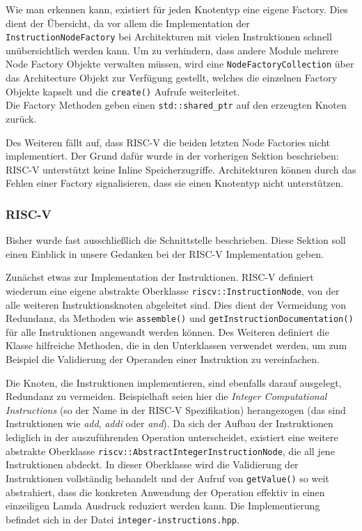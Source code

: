 Wie man erkennen kann, existiert für jeden Knotentyp eine eigene Factory. Dies
dient der Übersicht, da vor allem die Implementation der
\texttt{InstructionNodeFactory} bei Architekturen mit vielen Instruktionen
schnell unübersichtlich werden kann. Um zu verhindern, dass andere Module
mehrere Node Factory Objekte verwalten müssen, wird eine
\texttt{NodeFactoryCollection} über das Architecture Objekt zur Verfügung
gestellt, welches die einzelnen Factory Objekte kapselt und die
\texttt{create()} Aufrufe weiterleitet. \\
Die Factory Methoden geben einen \texttt{std::shared\_ptr} auf den erzeugten
Knoten zurück.

Des Weiteren fällt auf, dass RISC-V die beiden letzten Node Factories nicht
implementiert. Der Grund dafür wurde in der vorherigen Sektion beschrieben:
RISC-V unterstützt keine Inline Speicherzugriffe. Architekturen können durch das
Fehlen einer Factory signalisieren, dass sie einen Knotentyp nicht unterstützen.

\subsubsection{RISC-V}

Bisher wurde fast ausschließlich die Schnittstelle beschrieben. Diese Sektion
soll einen Einblick in unsere Gedanken bei der RISC-V Implementation geben.

Zunächst etwas zur Implementation der Instruktionen. RISC-V definiert wiederum
eine eigene abstrakte Oberklasse \texttt{riscv::InstructionNode}, von der alle
weiteren Instruktionsknoten abgeleitet sind. Dies dient der Vermeidung von
Redundanz, da Methoden wie \texttt{assemble()} und
\texttt{getInstructionDocumentation()} für alle Instruktionen angewandt werden
können. Des Weiteren definiert die Klasse hilfreiche Methoden, die in den
Unterklassen verwendet werden, um zum Beispiel die Validierung der Operanden
einer Instruktion zu vereinfachen.

Die Knoten, die Instruktionen implementieren, sind ebenfalls darauf ausgelegt,
Redundanz zu vermeiden. Beispielhaft seien hier die \textit{Integer
Computational Instructions} (so der Name in der RISC-V Spezifikation)
herangezogen (das sind Instruktionen wie \textit{add}, \textit{addi} oder
\textit{and}). Da sich der Aufbau der Instruktionen lediglich in der
auszuführenden Operation unterscheidet, existiert eine weitere abstrakte
Oberklasse \texttt{riscv::AbstractIntegerInstructionNode}, die all jene
Instruktionen abdeckt. In dieser Oberklasse wird die Validierung der
Instruktionen vollständig behandelt und der Aufruf von \texttt{getValue()} so
weit abstrahiert, dass die konkreten Anwendung der Operation effektiv in einen
einzeiligen Lamda Ausdruck reduziert werden kann. Die Implementierung befindet
sich in der Datei \texttt{integer-instructions.hpp}.

